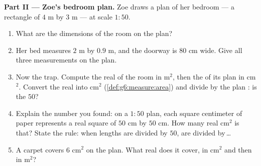 \begin{problem}
\medskip
\noindent\textbf{Part II --- Zoe's bedroom plan.}
Zoe draws a plan of her bedroom --- a rectangle of $4$ m by
$3$ m --- at scale $1:50$.
\begin{enumerate}[resume]
  \item What are the dimensions of the room on the plan?
  \item Her bed measures $2$ m by $0.9$ m, and the doorway is
        $80$ cm wide. Give all three measurements on the plan.
  \item Now the trap. Compute the real  of the room in
        m$^2$, then the  of its plan in cm$^2$. Convert the
        real  into cm$^2$
        (\cref{def:g6:measure:area}) and divide by the plan
        : is the  $50$?
  \item Explain the number you found: on a $1:50$ plan, each
        square centimeter of paper represents a real square of
        $50$ cm by $50$ cm. How many real cm$^2$ is that? State
        the rule: when lengths are divided by $50$,  are
        divided by\,\dots
  \item A  carpet covers $6$ cm$^2$ on the plan. What real
         does it cover, in cm$^2$ and then in m$^2$?
\end{enumerate}


\end{problem}
